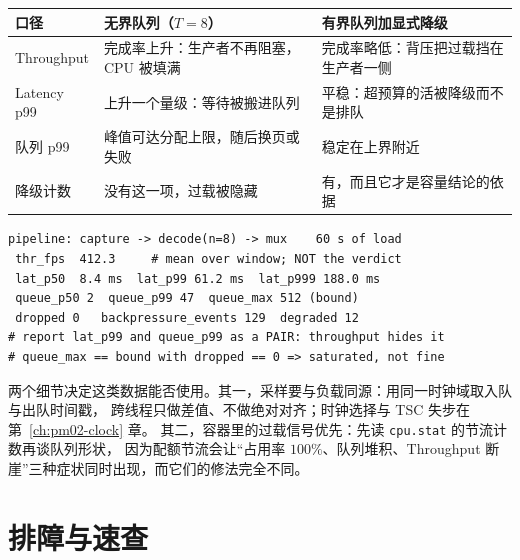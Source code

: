 \documentclass[12pt,a4paper,fontset=fandol]{ctexbook}
\newcommand{\Tp}[1]{\texttt{#1}}
\newcommand{\Lang}[1]{\textsf{#1}}
\newcommand{\MLat}{\Lang{Latency}}
\newcommand{\MThr}{\Lang{Throughput}}
\newcommand{\Mx}[1]{\textsf{#1}}
\begin{document}
\begin{compare}[title={无界队列的``变快''与两个必须并列的指标}]
\small
\begin{tabular}{>{\raggedright\arraybackslash}p{}
                >{\raggedright\arraybackslash}p{}
                >{\raggedright\arraybackslash}p{}}
\toprule
口径 & 无界队列（$T=8$） & 有界队列加显式降级 \\
\midrule
\MThr{} & 完成率上升：生产者不再阻塞，CPU 被填满 & 完成率略低：背压把过载挡在生产者一侧 \\
\MLat{} \Mx{p99} & 上升一个量级：等待被搬进队列 & 平稳：超预算的活被降级而不是排队 \\
队列 \Mx{p99} & 峰值可达分配上限，随后换页或失败 & 稳定在上界附近 \\
降级计数 & 没有这一项，过载被隐藏 & 有，而且它才是容量结论的依据 \\
\bottomrule
\end{tabular}
\end{compare}

\begin{lstlisting}[style=outstyle, label={lst:pm09-queue},
caption={异步流水线报告片段的示意输出/格式示例（非本仓库实测值）。}]
pipeline: capture -> decode(n=8) -> mux    60 s of load
 thr_fps  412.3     # mean over window; NOT the verdict
 lat_p50  8.4 ms  lat_p99 61.2 ms  lat_p999 188.0 ms
 queue_p50 2  queue_p99 47  queue_max 512 (bound)
 dropped 0   backpressure_events 129  degraded 12
# report lat_p99 and queue_p99 as a PAIR: throughput hides it
# queue_max == bound with dropped == 0 => saturated, not fine
\end{lstlisting}

两个细节决定这类数据能否使用。其一，采样要与负载同源：用同一时钟域取入队与出队时间戳，
跨线程只做差值、不做绝对对齐；时钟选择与 TSC 失步在第~\ref{ch:pm02-clock} 章。
其二，容器里的过载信号优先：先读 \Tp{cpu.stat} 的节流计数再谈队列形状，
因为配额节流会让``占用率 $100\%$、队列堆积、\MThr{} 断崖''三种症状同时出现，而它们的修法完全不同。

\section{排障与速查}
\label{sec:pm09-trouble}
\end{document}
